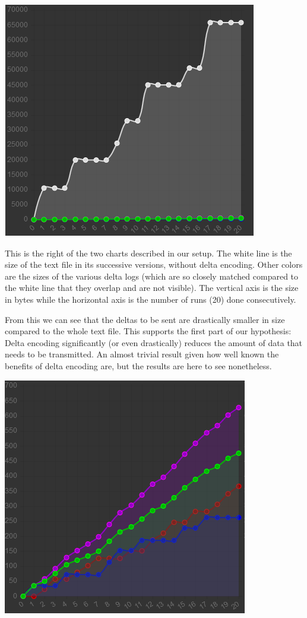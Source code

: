 \documentclass[12pt,a4paper]{article}
\begin{document}
		\begin{center}\includegraphics[]{resultsChartRight}\end{center}
		
		This is the right of the two charts described in our setup. The white line is the size of the text file in its successive versions, without delta encoding. Other colors are the sizes of the various delta logs (which are so closely matched compared to the white line that they overlap and are not visible). The vertical axis is the size in bytes while the horizontal axis is the number of runs (20) done consecutively. 
		
		From this we can see that the deltas to be sent are drastically smaller in size compared to the whole text file. This supports the first part of our hypothesis: Delta encoding significantly (or even drastically) reduces the amount of data that needs to be transmitted. An almost trivial result given how well known the benefits of delta encoding are, but the results are here to see nonetheless.

		\begin{center}\includegraphics[]{resultsChartLeft}\end{center}
\end{document}
